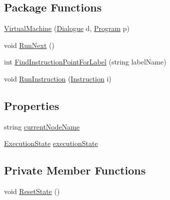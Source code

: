 \subsection*{Package Functions}
\begin{DoxyCompactItemize}
\item 
\hyperlink{a00136_aefa64c4353e5c261f1189649638e49a6}{Virtual\-Machine} (\hyperlink{a00070}{Dialogue} d, \hyperlink{a00124}{Program} p)
\item 
void \hyperlink{a00136_af3cc0337914b9f66454a3d52208dba5f}{Run\-Next} ()
\item 
int \hyperlink{a00136_af613c8b2d098678b6ea05b509c0a0cb6}{Find\-Instruction\-Point\-For\-Label} (string label\-Name)
\item 
void \hyperlink{a00136_ad2caf9ca4f00cdcbd58983be7c106971}{Run\-Instruction} (\hyperlink{a00093}{Instruction} i)
\end{DoxyCompactItemize}
\subsection*{Properties}
\begin{DoxyCompactItemize}
\item 
string \hyperlink{a00136_ab3afe8360a344c16c21213edb3641481}{current\-Node\-Name}
\item 
\hyperlink{a00136_add28fa9c8a45ca579e84d05920bbc42d}{Execution\-State} \hyperlink{a00136_a66491da06023dabfb63d09e6ccbba74f}{execution\-State}
\end{DoxyCompactItemize}
\subsection*{Private Member Functions}
\begin{DoxyCompactItemize}
\item 
void \hyperlink{a00136_a3ba945c66cb8ba031357a1771453f82b}{Reset\-State} ()
\end{DoxyCompactItemize}
